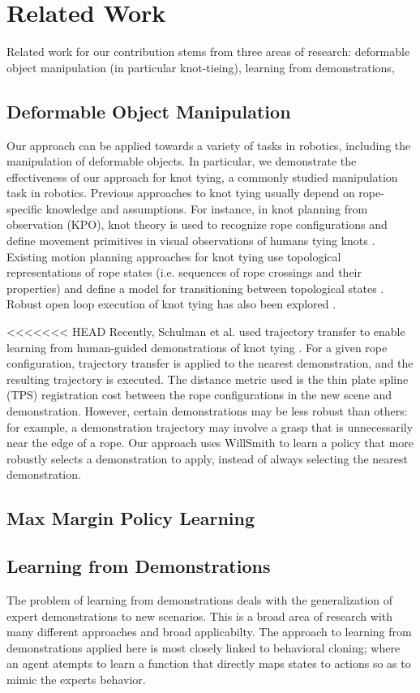 \section{Related Work}
Related work for our contribution stems from three areas of research: deformable object manipulation (in particular knot-tieing), learning from demonstrations, 
\subsection{Deformable Object Manipulation}
Our approach can be applied towards a variety of tasks in robotics,
including the manipulation of deformable objects.
In particular, we demonstrate the effectiveness of our approach for
knot tying, a commonly studied manipulation task in robotics.
Previous approaches to knot tying usually depend on rope-specific knowledge
and assumptions.
For instance, in knot planning from observation (KPO), knot theory is used
to recognize rope configurations and define movement primitives in visual
observations of humans tying knots \cite{Morita_ICRA2003, Takamatsu_TransRob2006}.
Existing motion planning approaches for knot tying use topological
representations of rope states (i.e. sequences of rope crossings and their
properties) and define a model for transitioning between topological states
\cite{Saha_ExpRobotics2008, Wakamatsu_IJRR2006}.
Robust open loop execution of knot tying has also been explored \cite{Bell_PhD2010}.

<<<<<<< HEAD
Recently, Schulman et al. used trajectory transfer to enable learning
from human-guided demonstrations of knot tying \cite{Schulmanetal_ISRR2013}.
For a given rope configuration, trajectory transfer is applied to the nearest
demonstration, and the resulting trajectory is executed.
The distance metric used is the thin plate spline (TPS) registration
cost between the rope configurations in the new scene and demonstration.
However, certain demonstrations may be less robust than others: for example,
a demonstration trajectory may involve a grasp that is unnecessarily near
the edge of a rope.
Our approach uses WillSmith to learn a policy that more robustly selects a
demonstration to apply, instead of always selecting the nearest demonstration.
\subsection{Max Margin Policy Learning}

\subsection{Learning from Demonstrations}
The problem of learning from demonstrations deals with the generalization of expert demonstrations to new scenarios. 
This is a broad area of research with many different approaches and broad applicabilty.
The approach to learning from demonstrations applied here is most closely linked to behavioral cloning; where an agent atempts to learn a function that directly maps states to actions so as to mimic the experts behavior. 

